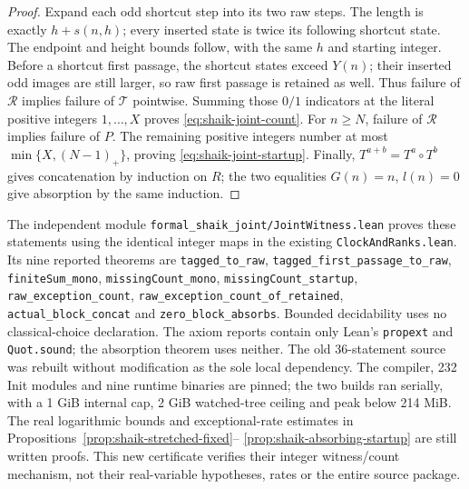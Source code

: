 \documentclass[11pt]{article}
\theoremstyle{remark}\newtheorem{remark}[proposition]{Remark}
\begin{document}
\begin{proof}
Expand each odd shortcut step into its two raw steps. The length is
exactly \(h+s(n,h)\); every inserted state is twice its following
shortcut state. The endpoint and height bounds follow, with the
same \(h\) and starting integer. Before a shortcut first passage,
the shortcut states exceed \(Y(n)\); their inserted odd images are
still larger, so raw first passage is retained as well.
Thus failure of \(\mathcal R\) implies failure of \(\mathcal T\)
pointwise. Summing those \(0/1\) indicators at the literal positive
integers \(1,\ldots,X\) proves \eqref{eq:shaik-joint-count}.
For \(n\ge N\), failure of \(\mathcal R\) implies failure of \(P\).
The remaining positive integers number at most
\(\min\{X,(N-1)_+\}\), proving \eqref{eq:shaik-joint-startup}.
Finally, \(T^{a+b}=T^a\circ T^b\) gives concatenation by induction
on \(R\); the two equalities \(G(n)=n\), \(l(n)=0\) give absorption
by the same induction.
\end{proof}

The independent module \texttt{formal\_shaik\_joint/JointWitness.lean}
proves these statements using the identical integer maps in the
existing \texttt{ClockAndRanks.lean}. Its nine reported theorems are
\texttt{tagged\_to\_raw}, \texttt{tagged\_first\_passage\_to\_raw},
\texttt{finiteSum\_mono}, \texttt{missingCount\_mono},
\texttt{missingCount\_startup}, \texttt{raw\_exception\_count},
\texttt{raw\_exception\_count\_of\_retained},
\texttt{actual\_block\_concat} and \texttt{zero\_block\_absorbs}.
Bounded decidability uses no classical-choice declaration.
The axiom reports contain only Lean's \texttt{propext} and
\texttt{Quot.sound}; the absorption theorem uses neither.
The old 36-statement source was rebuilt without modification as the
sole local dependency. The compiler, 232 Init modules and nine runtime
binaries are pinned; the two builds ran serially, with a 1 GiB internal
cap, 2 GiB watched-tree ceiling and peak below 214 MiB.
The real logarithmic bounds and exceptional-rate estimates in
Propositions~\ref{prop:shaik-stretched-fixed}--%
\ref{prop:shaik-absorbing-startup} are still written proofs.
This new certificate verifies their integer witness/count mechanism,
not their real-variable hypotheses, rates or the entire source package.
\end{document}
